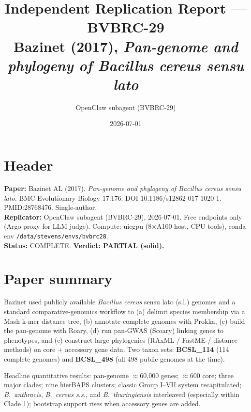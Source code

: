 \documentclass[11pt]{article}
\title{Independent Replication Report --- BVBRC-29\\
\large Bazinet (2017), \emph{Pan-genome and phylogeny of Bacillus cereus sensu lato}}
\author{OpenClaw subagent (BVBRC-29)}
\date{2026-07-01}
\begin{document}
\maketitle

\section*{Header}
\textbf{Paper:} Bazinet AL (2017). \emph{Pan-genome and phylogeny of Bacillus cereus sensu lato.} BMC Evolutionary Biology 17:176. DOI 10.1186/s12862-017-1020-1. PMID:28768476. Single-author. \\
\textbf{Replicator:} OpenClaw subagent (BVBRC-29), 2026-07-01. Free endpoints only (Argo proxy for LLM judge). Compute: uicgpu (8$\times$A100 host, CPU tools), conda env \texttt{/data/stevens/envs/bvbrc28}. \\
\textbf{Status:} COMPLETE. \textbf{Verdict: PARTIAL (solid).}

\section{Paper summary}
Bazinet used publicly available \emph{Bacillus cereus} sensu lato (s.l.) genomes and a standard comparative-genomics workflow to (a) delimit species membership via a Mash k-mer distance tree, (b) annotate complete genomes with Prokka, (c) build the pan-genome with Roary, (d) run pan-GWAS (Scoary) linking genes to phenotypes, and (e) construct large phylogenies (RAxML / FastME / distance methods) on core + accessory gene data. Two taxon sets: \textbf{BCSL\_114} (114 complete genomes) and \textbf{BCSL\_498} (all 498 public genomes at the time).

Headline quantitative results: pan-genome $\approx$60{,}000 genes; $\approx$600 core; three major clades; nine hierBAPS clusters; classic Group I--VII system recapitulated; \emph{B.\ anthracis}, \emph{B.\ cereus s.s.}, and \emph{B.\ thuringiensis} interleaved (especially within Clade 1); bootstrap support rises when accessory genes are added.
\end{document}
